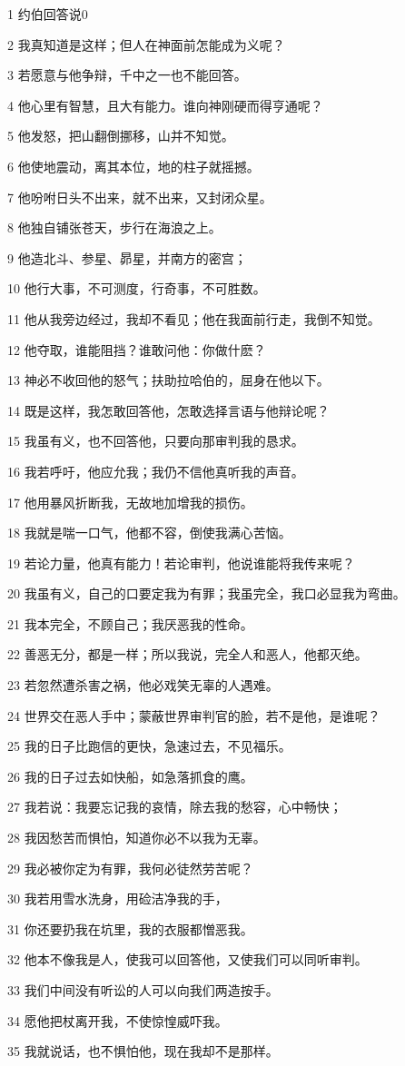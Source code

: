 \par 1 约伯回答说0
\par 2 我真知道是这样；但人在神面前怎能成为义呢？
\par 3 若愿意与他争辩，千中之一也不能回答。
\par 4 他心里有智慧，且大有能力。谁向神刚硬而得亨通呢？
\par 5 他发怒，把山翻倒挪移，山并不知觉。
\par 6 他使地震动，离其本位，地的柱子就摇撼。
\par 7 他吩咐日头不出来，就不出来，又封闭众星。
\par 8 他独自铺张苍天，步行在海浪之上。
\par 9 他造北斗、参星、昴星，并南方的密宫；
\par 10 他行大事，不可测度，行奇事，不可胜数。
\par 11 他从我旁边经过，我却不看见；他在我面前行走，我倒不知觉。
\par 12 他夺取，谁能阻挡？谁敢问他：你做什麽？
\par 13 神必不收回他的怒气；扶助拉哈伯的，屈身在他以下。
\par 14 既是这样，我怎敢回答他，怎敢选择言语与他辩论呢？
\par 15 我虽有义，也不回答他，只要向那审判我的恳求。
\par 16 我若呼吁，他应允我；我仍不信他真听我的声音。
\par 17 他用暴风折断我，无故地加增我的损伤。
\par 18 我就是喘一口气，他都不容，倒使我满心苦恼。
\par 19 若论力量，他真有能力！若论审判，他说谁能将我传来呢？
\par 20 我虽有义，自己的口要定我为有罪；我虽完全，我口必显我为弯曲。
\par 21 我本完全，不顾自己；我厌恶我的性命。
\par 22 善恶无分，都是一样；所以我说，完全人和恶人，他都灭绝。
\par 23 若忽然遭杀害之祸，他必戏笑无辜的人遇难。
\par 24 世界交在恶人手中；蒙蔽世界审判官的脸，若不是他，是谁呢？
\par 25 我的日子比跑信的更快，急速过去，不见福乐。
\par 26 我的日子过去如快船，如急落抓食的鹰。
\par 27 我若说：我要忘记我的哀情，除去我的愁容，心中畅快；
\par 28 我因愁苦而惧怕，知道你必不以我为无辜。
\par 29 我必被你定为有罪，我何必徒然劳苦呢？
\par 30 我若用雪水洗身，用硷洁净我的手，
\par 31 你还要扔我在坑里，我的衣服都憎恶我。
\par 32 他本不像我是人，使我可以回答他，又使我们可以同听审判。
\par 33 我们中间没有听讼的人可以向我们两造按手。
\par 34 愿他把杖离开我，不使惊惶威吓我。
\par 35 我就说话，也不惧怕他，现在我却不是那样。

